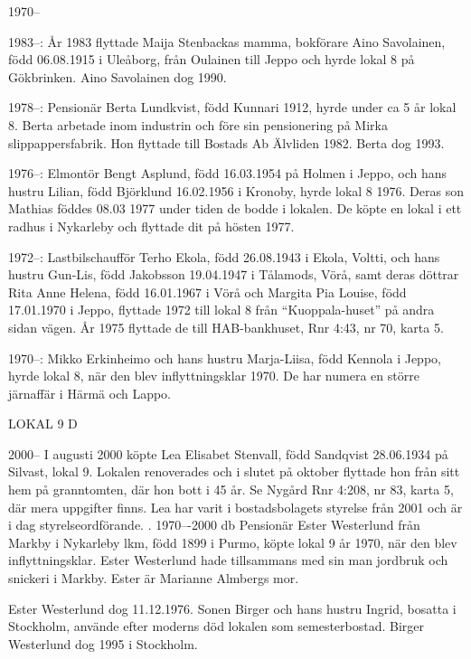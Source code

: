  1970--

1983--: År 1983 flyttade Maija Stenbackas mamma, bokförare Aino Savolainen, född 06.08.1915 i Uleåborg, från Oulainen till Jeppo och hyrde lokal 8 på Gökbrinken. Aino Savolainen dog 1990.

1978--: Pensionär Berta Lundkvist, född Kunnari 1912, hyrde under ca 5 år lokal 8. Berta arbetade inom industrin och före sin pensionering på Mirka slippappersfabrik. Hon flyttade till Bostads Ab Älvliden 1982. Berta dog 1993.

1976--: Elmontör Bengt Asplund, född 16.03.1954 på Holmen i Jeppo, och hans hustru Lilian, född Björklund 16.02.1956 i Kronoby, hyrde lokal 8 1976. Deras son Mathias föddes 08.03 1977 under tiden de bodde i lokalen. De köpte en lokal i ett radhus i Nykarleby och flyttade dit på hösten 1977.

1972--: Lastbilschaufför Terho Ekola, född 26.08.1943 i Ekola, Voltti, och hans hustru Gun-Lis, född Jakobsson 19.04.1947 i Tålamods, Vörå, samt deras döttrar Rita Anne Helena, född 16.01.1967 i Vörå och Margita Pia Louise, född 17.01.1970 i Jeppo, flyttade 1972 till lokal 8 från ``Kuoppala-huset'' på andra sidan vägen. År 1975 flyttade de till HAB-bankhuset, Rnr 4:43, nr 70, karta 5.

1970--: Mikko Erkinheimo och hans hustru Marja-Liisa, född Kennola i Jeppo, hyrde lokal 8, när den blev inflyttningsklar 1970. De har numera en större järnaffär i Härmä och Lappo.


LOKAL 9 D

 2000--
I augusti 2000 köpte Lea Elisabet Stenvall, född Sandqvist 28.06.1934 på Silvast, lokal 9. Lokalen renoverades och i slutet på oktober flyttade hon från sitt hem på granntomten, där hon bott i 45 år. Se Nygård Rnr 4:208, nr 83, karta 5, där mera uppgifter finns. Lea har varit i bostadsbolagets styrelse från 2001 och är i dag styrelseordförande.
		.
 1970---2000 db
Pensionär Ester Westerlund från Markby i Nykarleby lkm, född 1899 i Purmo, köpte lokal 9 år 1970, när den blev inflyttningsklar. Ester Westerlund hade tillsammans med sin man jordbruk och snickeri i Markby. Ester är Marianne Almbergs mor.

Ester Westerlund dog 11.12.1976. Sonen Birger och hans hustru Ingrid, bosatta i Stockholm, använde efter moderns död lokalen som semesterbostad. Birger Westerlund dog 1995 i Stockholm.



